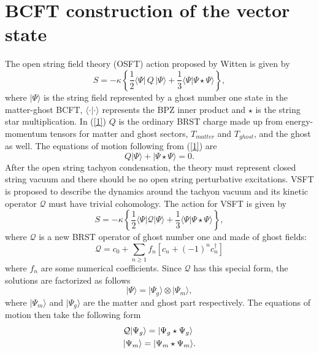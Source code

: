 \documentclass[a4paper,12pt]{article}
\begin{document}
\section{BCFT construction of the vector state}

The open string field theory (OSFT) action proposed by Witten is given by
\cite{w}
\begin{equation}
S=-\kappa\left\{\frac 12\langle\Psi|\,Q\,|\Psi\rangle+\frac 13
\langle\Psi|\Psi\star\Psi\rangle\right\},
\label{1}
\end{equation}
where $|\Psi\rangle$ is the string field represented by a ghost number one
state in the matter-ghost BCFT, $\langle\cdot |\cdot \rangle$ represents the
BPZ inner product and $\star$ is the string star multiplication. In
(\ref{1}) $Q$ is the ordinary BRST charge made up from 
energy-momentum tensors for matter and ghost sectors, $T_{matter}$ and
$T_{ghost}$, and the ghost as well. The equations of motion following from
(\ref{1}) are
\begin{equation}
Q|\Psi\rangle+|\Psi\star\Psi\rangle=0.
\label{2}
\end{equation}
After the open string tachyon condensation, the theory must represent closed 
string vacuum and there should be no open string perturbative excitations.
VSFT is proposed to describe the dynamics around the tachyon vacuum and
its kinetic operator $\mathcal{Q}$ must have trivial cohomology. 
The action for VSFT is given by
\begin{equation}
S=-\kappa\left\{\frac 12\langle\Psi|
\mathcal{Q}|\Psi\rangle+\frac 13
\langle\Psi|\Psi\star\Psi\rangle\right\},
\label{3}
\end{equation}
where $\mathcal{Q}$ is a new BRST operator of ghost number one and 
made of ghost fields:
\begin{equation}
\mathcal{Q}=c_0+\sum\limits_{n\geq 1}f_n[c_n+(-1)^nc^\dagger_n]
\label{4}
\end{equation}
where $f_n$ are some numerical coefficients. Since $\mathcal{Q}$ has this 
special form, the solutions are factorized as follows
\begin{equation}
|\Psi\rangle=|\Psi_g\rangle\otimes|\Psi_m\rangle ,
\label{5}
\end{equation}
where $|\Psi_m\rangle$  and $|\Psi_g\rangle$ are the
matter and ghost part respectively. The equations of motion then 
take the following form
\begin{align}
& \mathcal{Q}|\Psi_g\rangle=|\Psi_g\star\Psi_g\rangle \notag \\
& |\Psi_m\rangle=|\Psi_m\star\Psi_m\rangle.
\label{6}
\end{align}
\end{document}
